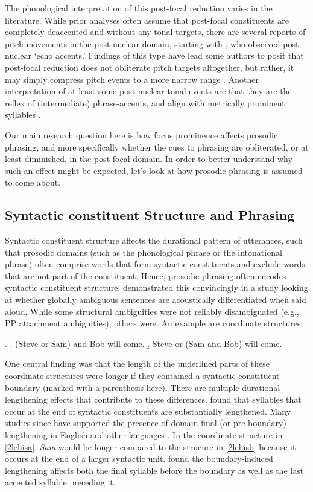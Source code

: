 \documentclass[preprint,review,12pt,authoryear,times]{elsarticle}
\begin{document}
The phonological interpretation of this post-focal reduction varies in the literature. While prior analyses often assume that post-focal constituents are completely deaccented and without any tonal targets, there are several reports of pitch movements in the post-nuclear domain, starting with \citet[223]{pierr80}, who observed post-nuclear `echo accents.' Findings of this type  have lead some authors to posit that post-focal reduction does not obliterate pitch targets altogether, but rather, it may simply compress pitch events to a more narrow range \citep[e.g.][]{sugah03, ishih03, ishih16, kugle17}.  Another interpretation of at least some post-nuclear tonal events are that they are the reflex of (intermediate) phrase-accents, and align with metrically prominent syllables \citep[see][for a detailed discussion of phrase accents]{grice00}.

Our main research question here is how focus prominence affects prosodic phrasing, and more specifically whether the cues to phrasing are obliterated, or at least diminished, in the post-focal domain. In order to better understand why such an effect might be expected, let's look at how prosodic phrasing is assumed to come about. 


\subsection{Syntactic constituent Structure and Phrasing}

Syntactic constituent structure affects the durational pattern of utterances, such that prosodic domains (such as the phonological phrase or the intonational phrase) often comprise words that form syntactic constituents and exclude words that are not part of the constituent. Hence, prosodic phrasing often encodes syntactic constituent structure. \citet{lehis73} demonstrated this convincingly in a study looking at whether globally ambiguous sentences are acoustically differentiated when said aloud. While some structural ambiguities were not reliably disambiguated (e.g., PP attachment ambiguities), others were. An example are coordinate structures:

\ex.\label{2lehis}
\a. (Steve or \underline{Sam) and Bob} will come.\label{2lehisa}
\b.  Steve or \underline{(Sam and Bob)} will come.\label{2lehisb}

\noindent One central finding was that the length of the underlined parts of these coordinate structures were longer if they contained a syntactic constituent boundary (marked with a parenthesis here).  There are multiple durational lengthening effects that contribute to these differences. \citet{klatt75} found that syllables that occur at the end of syntactic constituents are substantially lengthened.  Many studies since have supported the presence of domain-final (or pre-boundary) lengthening in English and other languages \citep{wight92, price91,shatt96,byrd98,cho01,byrd03,cho16}. In the coordinate structure in \ref{2lehisa}, {\em Sam} would be longer compared to the strucure in \ref{2lehisb} because it occurs at the end of a larger syntactic unit. \citet{turk07} found the boundary-induced lengthening affects both the final syllable before the boundary as well as the last accented syllable preceding it. 
\end{document}
